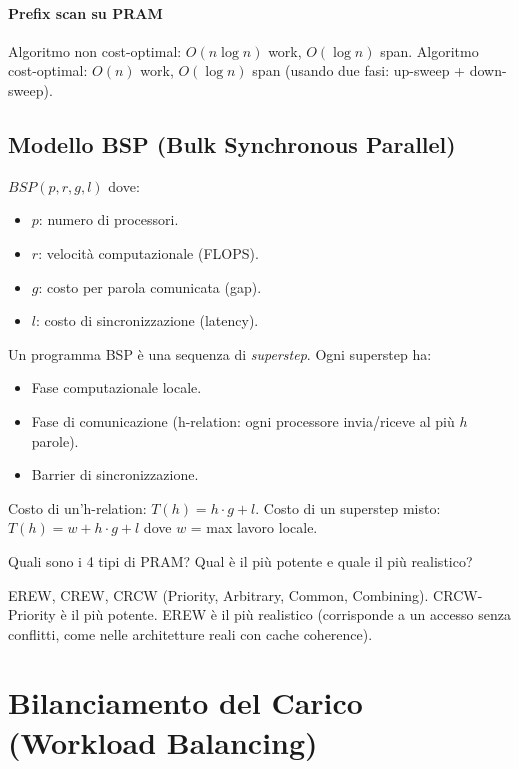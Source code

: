 \documentclass[11pt,a4paper]{article}
\theoremstyle{remark}
\newenvironment{esercizio}[1][]{%
  \begin{tcolorbox}[breakable,title={\textbf{Esercizio / Domanda d'esame}\ifx&#1&\else: #1\fi},
    colback=yellow!5!white, colframe=orange!75!black, fonttitle=\small\bfseries]%
}{%
  \end{tcolorbox}%
}
\newenvironment{risposta}{%
  \begin{tcolorbox}[breakable,title={\textbf{Risposta}},
    colback=green!5!white, colframe=green!50!black, fonttitle=\small\bfseries]%
}{%
  \end{tcolorbox}%
}
\begin{document}
\paragraph{Prefix scan su PRAM}
Algoritmo non cost-optimal: $O(n \log n)$ work, $O(\log n)$ span.
Algoritmo cost-optimal: $O(n)$ work, $O(\log n)$ span (usando due fasi: up-sweep + down-sweep).

\subsection{Modello BSP (Bulk Synchronous Parallel)}

$BSP(p, r, g, l)$ dove:
\begin{itemize}
  \item $p$: numero di processori.
  \item $r$: velocità computazionale (FLOPS).
  \item $g$: costo per parola comunicata (gap).
  \item $l$: costo di sincronizzazione (latency).
\end{itemize}

Un programma BSP è una sequenza di \emph{superstep}. Ogni superstep ha:
\begin{itemize}
  \item Fase computazionale locale.
  \item Fase di comunicazione (h-relation: ogni processore invia/riceve al più $h$ parole).
  \item Barrier di sincronizzazione.
\end{itemize}

Costo di un'h-relation: $T(h) = h \cdot g + l$.
Costo di un superstep misto: $T(h) = w + h \cdot g + l$ dove $w$ = max lavoro locale.

\begin{esercizio}
Quali sono i 4 tipi di PRAM? Qual è il più potente e quale il più realistico?
\end{esercizio}
\begin{risposta}
EREW, CREW, CRCW (Priority, Arbitrary, Common, Combining). CRCW-Priority è il più potente. EREW è il più realistico (corrisponde a un accesso senza conflitti, come nelle architetture reali con cache coherence).
\end{risposta}

\section{Bilanciamento del Carico (Workload Balancing)}
\end{document}
